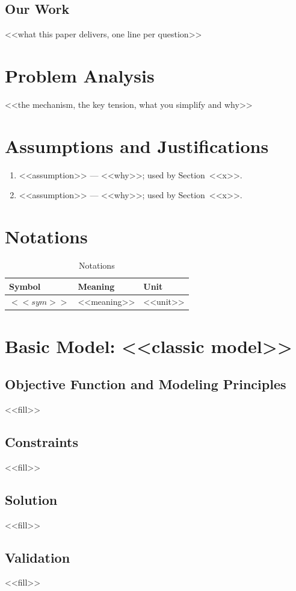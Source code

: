 \documentclass[<<options>>]{apmcmthesis}
\begin{document}
\subsection{Our Work}
<<what this paper delivers, one line per question>>
\section{Problem Analysis}
<<the mechanism, the key tension, what you simplify and why>>
\section{Assumptions and Justifications}
\begin{enumerate}
  \item <<assumption>> --- <<why>>; used by Section~<<x>>.
  \item <<assumption>> --- <<why>>; used by Section~<<x>>.
\end{enumerate}
\section{Notations}
\begin{table}[htbp]\centering\caption{Notations}\label{tab:notation}
\begin{tabular}{@{}lll@{}}\toprule Symbol & Meaning & Unit \\ \midrule
$<<sym>>$ & <<meaning>> & <<unit>> \\ \bottomrule\end{tabular}\end{table}
\section{Basic Model: <<classic model>>}
\subsection{Objective Function and Modeling Principles}
<<fill>>
\subsection{Constraints}
<<fill>>
\subsection{Solution}
<<fill>>
\subsection{Validation}
<<fill>>
\end{document}
